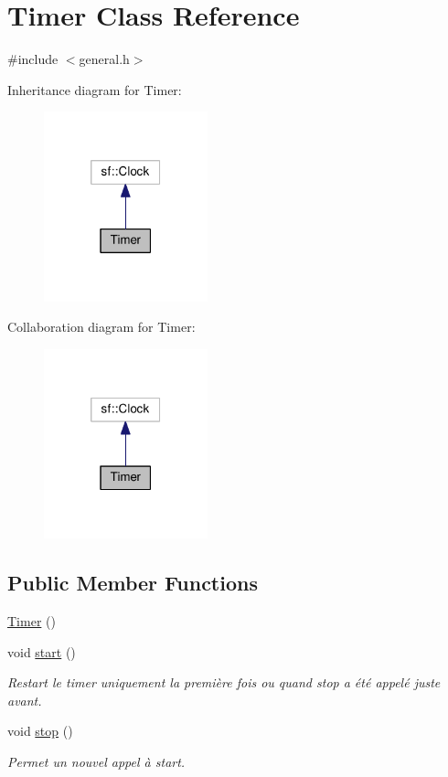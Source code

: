 \hypertarget{class_timer}{\section{Timer Class Reference}
\label{class_timer}
}


{\ttfamily \#include $<$general.\-h$>$}



Inheritance diagram for Timer\-:\nopagebreak
\begin{figure}[H]
\begin{center}
\leavevmode
\includegraphics[width=134pt]{class_timer__inherit__graph}
\end{center}
\end{figure}


Collaboration diagram for Timer\-:\nopagebreak
\begin{figure}[H]
\begin{center}
\leavevmode
\includegraphics[width=134pt]{class_timer__coll__graph}
\end{center}
\end{figure}
\subsection*{Public Member Functions}
\begin{DoxyCompactItemize}
\item 
\hyperlink{class_timer_a5f16e8da27d2a5a5242dead46de05d97}{Timer} ()
\item 
void \hyperlink{class_timer_a3a8b5272198d029779dc9302a54305a8}{start} ()
\begin{DoxyCompactList}\small\item\em Restart le timer uniquement la première fois ou quand stop a été appelé juste avant. \end{DoxyCompactList}\item 
void \hyperlink{class_timer_a63f0eb44b27402196590a03781515dba}{stop} ()
\begin{DoxyCompactList}\small\item\em Permet un nouvel appel à start. \end{DoxyCompactList}\end{DoxyCompactItemize}
